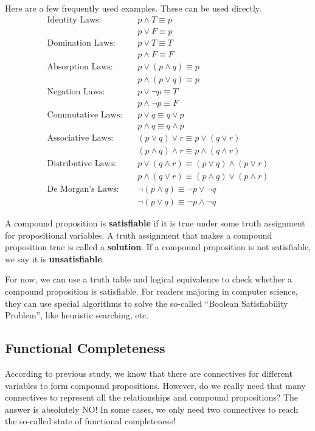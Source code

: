 \documentclass[oneside]{book}
\begin{document}
Here are a few frequently used examples. These can be used directly.
\begin{align*}
    \text{Identity Laws:} \quad & p \wedge T \equiv p \\
    & p \vee F \equiv p \\
    \text{Domination Laws:} \quad & p \vee T \equiv T \\
    & p \wedge F \equiv F \\
    \text{Absorption Laws:} \quad & p \vee (p \wedge q) \equiv p \\
    & p \wedge (p \vee q) \equiv p \\
    \text{Negation Laws:} \quad & p \vee \neg p \equiv T \\
    & p \wedge \neg p \equiv F \\
    \text{Commutative Laws:} \quad & p \vee q \equiv q \vee p \\
    & p \wedge q \equiv q \wedge p \\
    \text{Associative Laws:} \quad & (p \vee q) \vee r \equiv p \vee (q \vee r) \\
    & (p \wedge q) \wedge r \equiv p \wedge (q \wedge r) \\
    \text{Distributive Laws:} \quad & p \vee (q \wedge r) \equiv (p \vee q) \wedge (p \vee r) \\
    & p \wedge (q \vee r) \equiv (p \wedge q) \vee (p \wedge r) \\
    \text{De Morgan’s Laws:} \quad & \neg(p \wedge q) \equiv \neg p \vee \neg q \\
    & \neg(p \vee q) \equiv \neg p \wedge \neg q
\end{align*}

\begin{definition}[Satisfiability]
A compound proposition is \textbf{satisfiable} if it is true under some truth assignment for propositional variables. A truth assignment that makes a compound proposition true is called a \textbf{solution}. If a compound proposition is not satisfiable, we say it is \textbf{unsatisfiable}.
\end{definition}

For now, we can use a truth table and logical equivalence to check whether a compound proposition is satisfiable. For readers majoring in computer science, they can use special algorithms to solve the so-called “Boolean Satisfiability Problem”, like heuristic searching, etc.

\subsection{Functional Completeness}
According to previous study, we know that there are connectives for different variables to form compound propositions. However, do we really need that many connectives to represent all the relationships and compound propositions? The answer is absolutely NO! In some cases, we only need two connectives to reach the so-called state of functional completeness!
\end{document}
